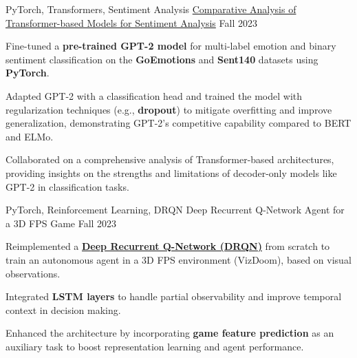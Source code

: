 \begin{cventries}
\cventry
    {PyTorch, Transformers, Sentiment Analysis} %
    {\href{https://github.com/aghassel/NLP-Sentiment-Analysis/}{Comparative Analysis of Transformer-based Models for Sentiment Analysis}} %
    {} %
    {Fall 2023} %
    {
      \begin{cvitems}
        \item {Fine-tuned a \textbf{pre-trained GPT-2 model} for multi-label emotion and binary sentiment classification on the \textbf{GoEmotions} and \textbf{Sent140} datasets using \textbf{PyTorch}.}
        \item {Adapted GPT-2 with a classification head and trained the model with regularization techniques (e.g., \textbf{dropout}) to mitigate overfitting and improve generalization, demonstrating GPT-2's competitive capability compared to BERT and ELMo.}
        \item {Collaborated on a comprehensive analysis of Transformer-based architectures, providing insights on the strengths and limitations of decoder-only models like GPT-2 in classification tasks.}
      \end{cvitems}
    }

\cventry
    {PyTorch, Reinforcement Learning, DRQN} %
    {Deep Recurrent Q-Network Agent for a 3D FPS Game} %
    {} %
    {Fall 2023} %
    {
      \begin{cvitems}
        \item {Reimplemented a \textbf{\href{https://arxiv.org/pdf/1609.05521}{Deep Recurrent Q-Network (DRQN)}} from scratch to train an autonomous agent in a 3D FPS environment (VizDoom), based on visual observations.}
        \item {Integrated \textbf{LSTM layers} to handle partial observability and improve temporal context in decision making.}
        \item {Enhanced the architecture by incorporating \textbf{game feature prediction} as an auxiliary task to boost representation learning and agent performance.}
      \end{cvitems}
    }



\end{cventries}
